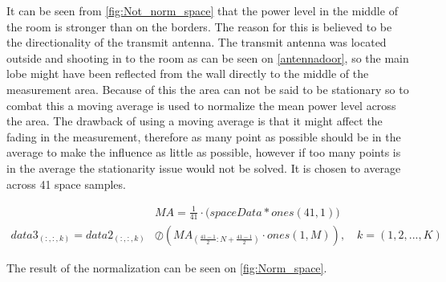 It can be seen from \autoref{fig:Not_norm_space} that the power level in the middle of the room is stronger than on the borders. The reason for this is believed to be the directionality of the transmit antenna. The transmit antenna was located outside and shooting in to the room as can be seen on \autoref{antennadoor}, so the main lobe might have been reflected from the wall directly to the middle of the measurement area. Because of this the area can not be said to be stationary so to combat this a moving average is used to normalize the mean power level across the area. The drawback of using a moving average is that it might affect the fading in the measurement, therefore as many point as possible should be in the average to make the influence as little as possible, however if too many points is in the average the stationarity issue would not be solved. It is chosen to average across 41 space samples.

\begin{align}
&MA = \frac{1}{41}\cdot \Big(spaceData*ones(41,1)\Big) \\
data3_{(:,:,k)} = data2_{(:,:,k)} &\oslash \left(MA_{\left(\frac{41-1}{2}:N+\frac{41-1}{2}\right)}\cdot ones(1,M)\right), \quad k = (1,2,...,K)
\end{align}

The result of the normalization can be seen on \autoref{fig:Norm_space}.

